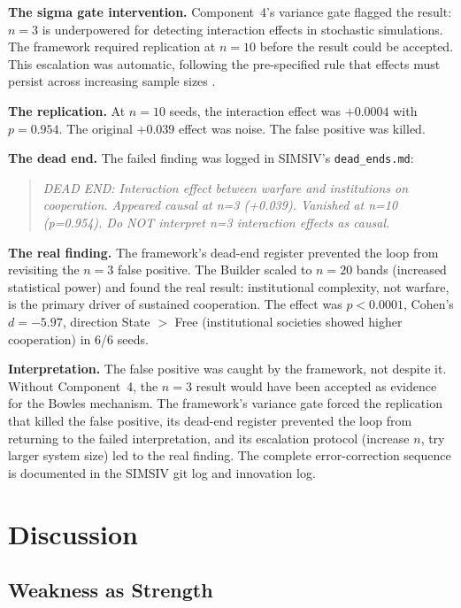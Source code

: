 \documentclass[11pt,a4paper]{article}
\begin{document}
\textbf{The sigma gate intervention.} Component~4's variance gate flagged the result: $n = 3$ is underpowered for detecting interaction effects in stochastic simulations. The framework required replication at $n = 10$ before the result could be accepted. This escalation was automatic, following the pre-specified rule that effects must persist across increasing sample sizes \citep[cf.][]{ioannidis2005}.

\textbf{The replication.} At $n = 10$ seeds, the interaction effect was $+0.0004$ with $p = 0.954$. The original $+0.039$ effect was noise. The false positive was killed.

\textbf{The dead end.} The failed finding was logged in SIMSIV's \texttt{dead\_ends.md}:

\begin{quote}
\textit{DEAD END: Interaction effect between warfare and institutions on cooperation. Appeared causal at n=3 (+0.039). Vanished at n=10 (p=0.954). Do NOT interpret n=3 interaction effects as causal.}
\end{quote}

\textbf{The real finding.} The framework's dead-end register prevented the loop from revisiting the $n = 3$ false positive. The Builder scaled to $n = 20$ bands (increased statistical power) and found the real result: institutional complexity, not warfare, is the primary driver of sustained cooperation. The effect was $p < 0.0001$, Cohen's $d = -5.97$, direction State $>$ Free (institutional societies showed higher cooperation) in 6/6 seeds.

\textbf{Interpretation.} The false positive was caught by the framework, not despite it. Without Component~4, the $n = 3$ result would have been accepted as evidence for the Bowles mechanism. The framework's variance gate forced the replication that killed the false positive, its dead-end register prevented the loop from returning to the failed interpretation, and its escalation protocol (increase $n$, try larger system size) led to the real finding. The complete error-correction sequence is documented in the SIMSIV git log and innovation log.

\section{Discussion}

\subsection{Weakness as Strength}
\end{document}
